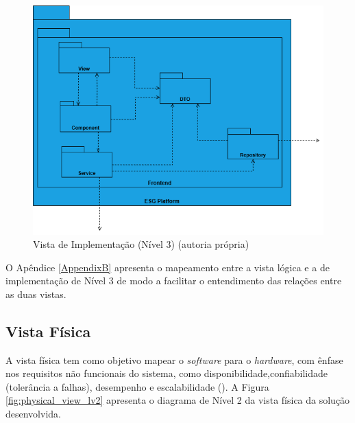\begin{figure}[H]
    \centering
    \includegraphics[width=4.75in,keepaspectratio]{frontmatter/assets/diagrams/Development View/Implementation Lv3.drawio.png}
    \caption{Vista de Implementação (Nível 3) (autoria própria)}
    \label{fig:development_view_lv3}
\end{figure}

O Apêndice \ref{AppendixB} apresenta o mapeamento entre a vista lógica e a de implementação de Nível 3 de modo a facilitar o entendimento das relações entre as duas vistas.
    
\subsection{Vista Física}

A vista física tem como objetivo mapear o \textit{software} para o \textit{hardware}, com ênfase nos requisitos não funcionais do sistema, como disponibilidade,confiabilidade (tolerância a falhas), desempenho e escalabilidade (\cite{Kruchten1995}). A Figura \ref{fig:physical_view_lv2} apresenta o diagrama de Nível 2 da vista física da solução desenvolvida.

